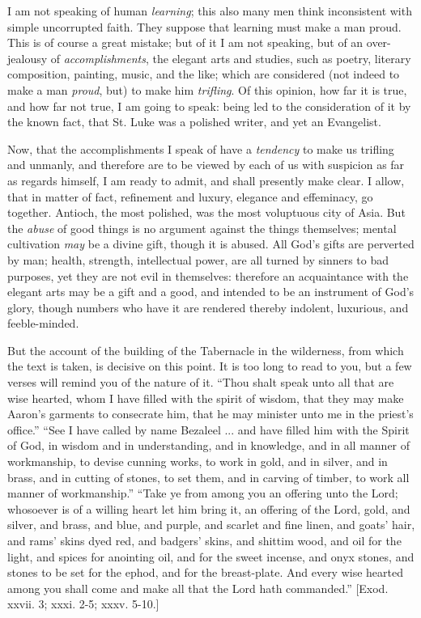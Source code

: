 I am not speaking of human \emph{learning}; this also many men think
inconsistent with simple uncorrupted faith. They suppose that learning
must make a man proud. This is of course a great mistake; but of it I am
not speaking, but of an over-jealousy of \emph{accomplishments}, the
elegant arts and studies, such as poetry, literary composition,
painting, music, and the like; which are considered (not indeed to make
a man \emph{proud}, but) to make him \emph{trifling}. Of this opinion,
how far it is true, and how far not true, I am going to speak: being led
to the consideration of it by the known fact, that St. Luke was a
polished writer, and yet an Evangelist.

Now, that the accomplishments I speak of have a \emph{tendency} to
make us trifling and unmanly, and therefore are to be viewed by each of
us with suspicion as far as regards himself, I am ready to admit, and
shall presently make clear. I allow, that in matter of fact, refinement
and luxury, elegance and effeminacy, go together. Antioch, the most
polished, was the most voluptuous city of Asia. But the \emph{abuse} of
good things is no argument against the things themselves; mental
cultivation \emph{may} be a divine gift, though it is abused. All God's
gifts are perverted by man; health, strength, intellectual power, are
all turned by sinners to bad purposes, yet they are not evil in
themselves: therefore an acquaintance with the elegant arts may be a
gift and a good, and intended to be an instrument of God's glory, though
numbers who have it are rendered thereby indolent, luxurious, and
feeble-minded.

But the account of the building of the Tabernacle in the wilderness,
from which the text is taken, is decisive on this point. It is too long
to read to you, but a few verses will remind you of the nature of it.
``Thou shalt speak unto all that are wise hearted, whom I have
filled with the spirit of wisdom, that they may make Aaron's garments to
consecrate him, that he may minister unto me in the priest's
office.'' ``See I have called by name Bezaleel ... and have
filled him with the Spirit of God, in wisdom and in understanding, and
in knowledge, and in all manner of workmanship, to devise cunning works,
to work in gold, and in silver, and in brass, and in cutting of stones,
to set them, and in carving of timber, to work all manner of
workmanship.'' ``Take ye from among you an offering unto the
Lord; whosoever is of a willing heart let him bring it, an offering of
the Lord, gold, and silver, and brass, and blue, and purple, and scarlet
and fine linen, and goats' hair, and rams' skins dyed red, and badgers'
skins, and shittim wood, and oil for the light, and spices for anointing
oil, and for the sweet incense, and onyx stones, and stones to be set
for the ephod, and for the breast-plate. And every wise hearted among
you shall come and make all that the Lord hath commanded.'' [Exod.
xxvii. 3; xxxi. 2-5; xxxv. 5-10.]

